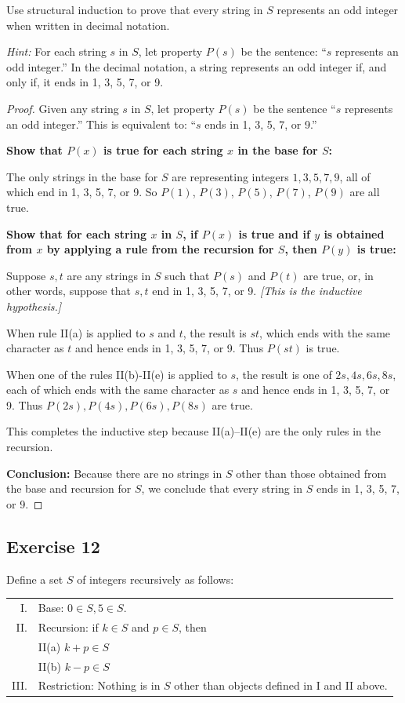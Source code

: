 \documentclass[14pt]{extarticle}
\begin{document}
Use structural induction to prove that every string in $S$ represents an odd integer when written in decimal notation.

{\it Hint:} For each string $s$ in $S$, let property $P(s)$ be the sentence: “$s$ represents an odd integer.” In the 
decimal notation, a string represents an odd integer if, and only if, it ends in 1, 3, 5, 7, or 9.

\begin{proof}
Given any string $s$ in $S$, let property $P(s)$ be the sentence “$s$ represents an odd integer.” This is 
equivalent to: ``$s$ ends in 1, 3, 5, 7, or 9.''

{\bf Show that $P(x)$ is true for each string $x$ in the base for $S$:}

The only strings in the base for $S$ are representing integers $1, 3, 5, 7, 9$, all of which end in 1, 3, 5, 7, 
or 9. So $P(1)$, $P(3)$, $P(5)$, $P(7)$, $P(9)$ are all true. 

{\bf Show that for each string $x$ in $S$, if $P(x)$ is true and if $y$ is obtained from $x$ by applying a rule 
from the recursion for $S$, then $P(y)$ is true:}

Suppose $s, t$ are any strings in $S$ such that $P(s)$ and $P(t)$ are true, or, in other words, suppose that $s, t$ end in 1, 3, 5, 7, or 9. {\it [This is the inductive hypothesis.]} 

When rule II(a) is applied to $s$ and $t$, the result is $st$, which ends with the same character as $t$ and hence 
ends in 1, 3, 5, 7, or 9. Thus $P(st)$ is true.

When one of the rules II(b)-II(e) is applied to $s$, the result is one of $2s, 4s, 6s, 8s$, each of which ends with 
the same character as $s$ and hence ends in 1, 3, 5, 7, or 9. Thus $P(2s), P(4s), P(6s), P(8s)$ are true.

This completes the inductive step because II(a)–II(e) are the only rules in the recursion.

{\bf Conclusion:} Because there are no strings in $S$ other than those obtained from the base and recursion for $S$, we 
conclude that every string in $S$ ends in 1, 3, 5, 7, or 9.
\end{proof}

\subsection{Exercise 12}
Define a set $S$ of integers recursively as follows:

\begin{tabular}{rl}
I. & Base: $0 \in S, 5 \in S$. \\
II. & Recursion: if $k \in S$ and $p \in S$, then \\
    & II(a) $k+p \in S$ \\
    & II(b) $k-p \in S$ \\
III. & Restriction: Nothing is in $S$ other than objects defined in I and II above.
\end{tabular}
\end{document}
